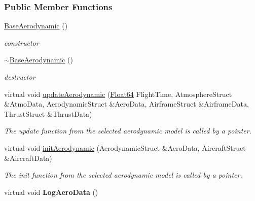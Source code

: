 \subsubsection*{Public Member Functions}
\begin{DoxyCompactItemize}
\item 
\mbox{\label{group___aerodynamic_aa05d0598119b1364cdb45cf478ae578c}} 
\hyperlink{group___aerodynamic_aa05d0598119b1364cdb45cf478ae578c}{Base\+Aerodynamic} ()
\begin{DoxyCompactList}\small\item\em constructor \end{DoxyCompactList}\item 
\mbox{\label{group___aerodynamic_a81d08f3a779e6e25245b6f3b545920cb}} 
\hyperlink{group___aerodynamic_a81d08f3a779e6e25245b6f3b545920cb}{$\sim$\+Base\+Aerodynamic} ()
\begin{DoxyCompactList}\small\item\em destructor \end{DoxyCompactList}\item 
\mbox{\label{group___aerodynamic_a6354f3c8433c7a2235041f843d4fe10e}} 
virtual void \hyperlink{group___aerodynamic_a6354f3c8433c7a2235041f843d4fe10e}{update\+Aerodynamic} (\hyperlink{group___tools_ga3f1431cb9f76da10f59246d1d743dc2c}{Float64} Flight\+Time, Atmosphere\+Struct \&Atmo\+Data, Aerodynamic\+Struct \&Aero\+Data, Airframe\+Struct \&Airframe\+Data, Thrust\+Struct \&Thrust\+Data)
\begin{DoxyCompactList}\small\item\em The update function from the selected aerodynamic model is called by a pointer. \end{DoxyCompactList}\item 
\mbox{\label{group___aerodynamic_a5ea58755a40507d217848efb151879c8}} 
virtual void \hyperlink{group___aerodynamic_a5ea58755a40507d217848efb151879c8}{init\+Aerodynamic} (Aerodynamic\+Struct \&Aero\+Data, Aircraft\+Struct \&Aircraft\+Data)
\begin{DoxyCompactList}\small\item\em The init function from the selected aerodynamic model is called by a pointer. \end{DoxyCompactList}\item 
\mbox{\label{group___aerodynamic_abaea76739e197627a6d09cff5b68af83}} 
virtual void {\bfseries Log\+Aero\+Data} ()
\end{DoxyCompactItemize}
\label{class_d_a_t_c_o_m_aerodymamic}
